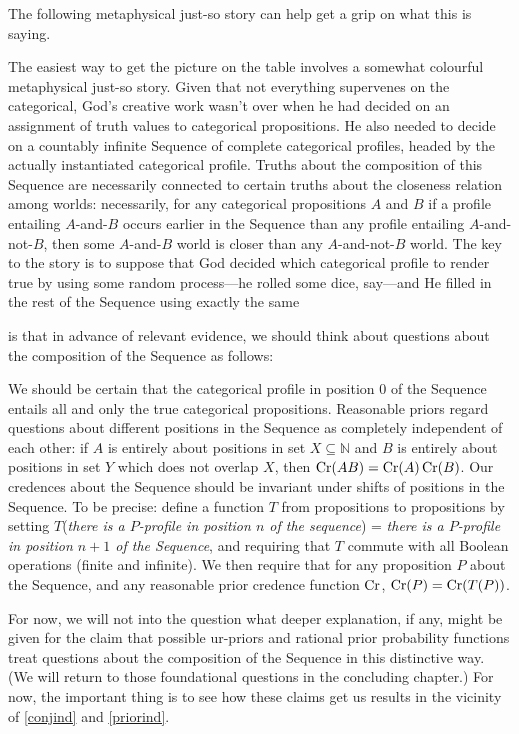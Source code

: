 \documentclass[If.tex]{subfiles}
\begin{document}
The following metaphysical just-so story can help get a grip on what this is saying.  

The easiest way to get the picture on the table involves a somewhat colourful metaphysical just-so story. Given that not everything supervenes on the categorical, God's creative work wasn't over when he had decided on an assignment of truth values to categorical propositions.  He also needed to decide on a countably infinite Sequence of complete categorical profiles, headed by the actually instantiated categorical profile.  Truths about the composition of this Sequence are necessarily connected to certain truths about the closeness relation among worlds: necessarily, for any categorical propositions $A$ and $B$ if a profile entailing $A$-and-$B$ occurs earlier in the Sequence than any profile entailing $A$-and-not-$B$, then some $A$-and-$B$ world is closer than any $A$-and-not-$B$ world. %
The key to the story is to suppose that God decided which categorical profile to render true by using some random process---he rolled some dice, say---and He filled in the rest of the Sequence using exactly the same 

 is that in advance of relevant evidence, we should think about questions about the composition of the Sequence as follows: 
\begin{prop}
	\ritem \label{truthrequirement}
	We should be certain that the categorical profile in position 0 of the Sequence entails all and only the true categorical propositions.
	\ritem \label{independencerequirement}
	Reasonable priors regard questions about different positions in the Sequence as completely independent of each other: if $A$ is entirely about positions in set $X⊆\mathbb{N}$ and $B$ is entirely about positions in set $Y$ which does not overlap $X$, then $\operatorname{Cr}(AB) = \operatorname{Cr}(A)\operatorname{Cr}(B)$. 
	\ritem \label{invariancerequirement}
	Our credences about the Sequence should be invariant under shifts of positions in the Sequence.  To be precise: define a function $T$ from propositions to propositions by setting $T$(\emph{there is a $P$-profile in position $n$ of the sequence}) = \emph{there is a $P$-profile in position $n+1$ of the Sequence}, and requiring that $T$ commute with all Boolean operations (finite and infinite).  We then require that for any proposition $P$ about the Sequence, and any reasonable prior credence function $\operatorname{Cr}$, $\operatorname{Cr}(P) = \operatorname{Cr}(T(P))$.  	
\end{prop}
For now, we will not into the question what deeper explanation, if any, might be given for the claim that possible ur-priors and rational prior probability functions treat questions about the composition of the Sequence in this distinctive way.  (We will return to those foundational questions in the concluding chapter.)  For now, the important thing is to see how these claims get us results in the vicinity of \ref{conjind} and \ref{priorind}. 
\end{document}
